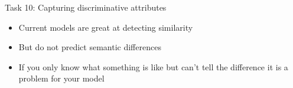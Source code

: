 \documentclass[10pt, compress]{beamer}
\begin{document}
\begin{frame}{Task 10: Capturing discriminative attributes}

\begin{itemize}
  \item Current models are great at detecting similarity
  \item But do not predict semantic differences
  \item If you only know what something is like but can't tell the difference it is a problem for your model
\end{itemize}


\end{frame}
\end{document}
